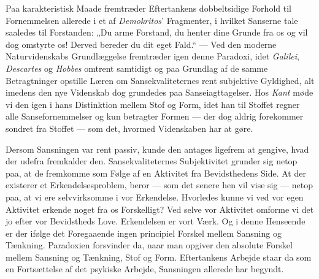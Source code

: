 \documentclass[12pt,a4paper]{book}
\begin{document}
Paa karakteristisk Maade fremtræder Eftertankens dobbeltsidige Forhold
til Fornemmelsen allerede i et af \emph{Demokritos}’ Fragmenter, i
hvilket Sanserne tale saaledes til Forstanden: „Du arme Forstand, du
henter dine Grunde fra os og vil dog omstyrte os! Derved bereder du dit
eget Fald.“ --- Ved den moderne Naturvidenskabs Grundlæggelse
fremtræder igen denne Paradoxi, idet \emph{Galilei}, \emph{Descartes}
og \emph{Hobbes} omtrent samtidigt og paa Grundlag af de samme
Betragtninger opstille Læren om Sansekvaliteternes rent subjektive
Gyldighed, alt imedens den nye Videnskab dog grundedes paa
Sanseiagttagelser. Hos \emph{Kant} møde vi den igen i hans Distinktion
mellem Stof og Form, idet han til Stoffet regner alle Sansefornemmelser
og kun betragter Formen --- der dog aldrig forekommer sondret fra
Stoffet --- som det, hvormed Videnskaben har at gøre.

Dersom Sansningen var rent passiv, kunde den antages ligefrem at
gengive, hvad der udefra fremkalder den. Sansekvaliteternes
Subjektivitet grunder sig netop paa, at de fremkomme som Følge af en
Aktivitet fra Bevidsthedens Side. At der existerer et
Erkendelsesproblem, beror --- som det senere hen vil vise sig --- netop
paa, at vi ere selvvirksomme i vor Erkendelse. Hvorledes kunne vi ved
vor egen Aktivitet erkende noget fra os Forskelligt? Ved selve vor
Aktivitet omforme vi det jo efter vor Bevidstheds Love. Erkendelsen er
vort Værk. Og i denne Henseende er der ifølge det Foregaaende ingen
principiel Forskel mellem Sansning og Tænkning. Paradoxien forsvinder
da, naar man opgiver den absolute Forskel mellem Sansning og Tænkning,
Stof og Form. Eftertankens Arbejde staar da som en Fortsættelse af det
psykiske Arbejde, Sansningen allerede har begyndt.
\end{document}
